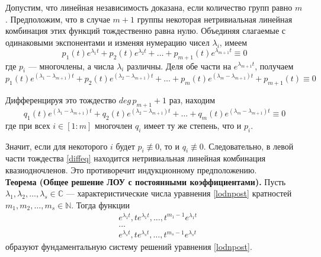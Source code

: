 Допустим, что линейная независимость доказана, если количество групп равно $m$. Предположим, что в случае $m + 1$ группы некоторая нетривиальная линейная комбинация этих функций тождественно равна нулю. Объединяя слагаемые с одинаковыми экспонентами и изменяя нумерацию чисел $\lambda_i$, имеем
\begin{equation*}
    p_1(t)e^{\lambda_1 t} + p_2(t)e^{\lambda_2 t} + \ldots + p_{m+1}(t)e^{\lambda_{m+1}t} \equiv 0
\end{equation*}
где $p_i$ --- многочлены, а числа $\lambda_i$ различны. Деля обе части на $e^{\lambda_{m+1}t}$, получаем
\begin{equation*}
    p_1(t)e^{(\lambda_1 - \lambda_{m+1}) t} + p_2(t)e^{(\lambda_2 - \lambda_{m+1}) t} + \ldots + p_m(t)e^{(\lambda_m - \lambda_{m+1}) t} + p_{m+1}(t) \equiv 0
\end{equation*}

Дифференцируя это тождество $deg\, p_{m+1} + 1$ раз, находим
\begin{equation}
    q_1(t)e^{(\lambda_1 - \lambda_{m+1}) t} + q_2(t)e^{(\lambda_2 - \lambda_{m+1}) t} + \ldots + q_m(t)e^{(\lambda_m - \lambda_{m+1}) t} \equiv 0 \label{diffeq}
\end{equation}
где при всех $i \in [1:m]$ многочлен $q_i$ имеет ту же степень, что и $p_i$.

Значит, если для некоторого $i$ будет $p_i \not\equiv 0$, то и $q_i \not\equiv 0$. Следовательно, в левой части тождества \eqref{diffeq} находится нетривиальная линейная комбинация квазиодночленов. Это противоречит индукционному предположению.\\

\noindent \textbf{Теорема (Общее решение ЛОУ с постоянными коэффициентами).} Пусть $\lambda_1, \lambda_2, \ldots, \lambda_s \in \mathbb{C}$ --- характеристические числа уравнения \eqref{lodnpost} кратностей $m_1, m_2, \ldots, m_s \in \mathbb{N}$. Тогда функции
\begin{equation}
    \begin{aligned}
         & e^{\lambda_1 t}, te^{\lambda_1 t}, \ldots, t^{m_1 - 1}e^{\lambda_1 t} \\
         & \ldots                                                                \\
         & e^{\lambda_s t}, te^{\lambda_s t}, \ldots, t^{m_s - 1}e^{\lambda_s t}
    \end{aligned} \label{fundsyst}
\end{equation}
образуют фундаментальную систему решений уравнения \eqref{lodnpost}.\\

